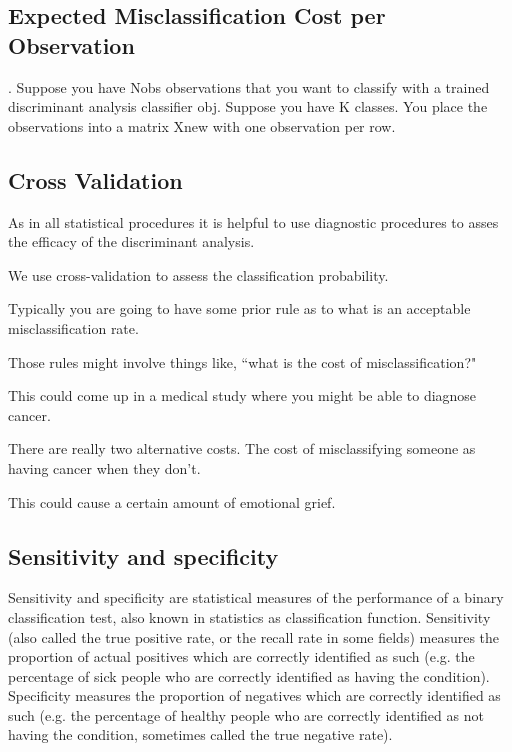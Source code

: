 \documentclass[12pt]{article} %
\begin{document}
\subsection{Expected Misclassification Cost per Observation}.  
Suppose you have Nobs observations that you want to classify with a trained discriminant analysis classifier obj. 
Suppose you have K classes. You place the observations into a matrix Xnew with one observation per row. 





\subsection*{Cross Validation}

As in all statistical procedures it is helpful to use diagnostic procedures to asses the efficacy of the discriminant analysis. 

We use cross-validation to assess the classification probability. 

Typically you are going to have some prior rule as to what is an acceptable misclassification rate. 

Those rules might involve things like, ``what is the cost of misclassification?" 

This could come up in a medical study where you might be able to diagnose cancer. 

There are really two alternative costs. The cost of misclassifying someone as having cancer when they don't. 

This could cause a certain amount of emotional grief.


\subsection*{Sensitivity and specificity}

Sensitivity and specificity are statistical measures of the performance of a binary classification test, also known in statistics as classification function. Sensitivity (also called the true positive rate, or the recall rate in some fields) measures the proportion of actual positives which are correctly identified as such (e.g. the percentage of sick people who are correctly identified as having the condition). Specificity measures the proportion of negatives which are correctly identified as such (e.g. the percentage of healthy people who are correctly identified as not having the condition, sometimes called the true negative rate). 
\end{document}
